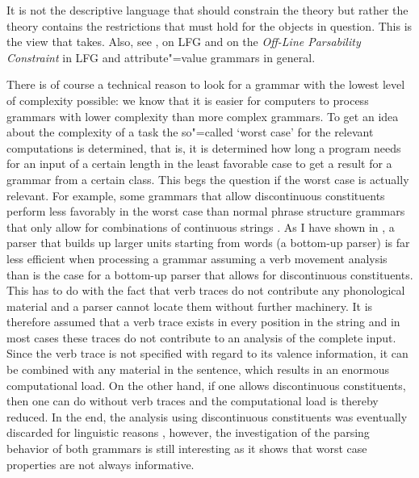 It is not the descriptive language that should constrain the theory but rather the theory contains the restrictions
that must hold for the objects in question. This is the view that \citet[, 280]{Chomsky81b} takes. Also, see 
,
 on LFG and  on the \emph{Off-Line Parsability Constraint}
in LFG and attribute"=value grammars in general.

There is of course a technical reason to look for a grammar with the lowest level of complexity possible:
we know that it is easier for computers to process grammars with lower complexity than more
complex grammars. To get an idea about the complexity of a task the so"=called `worst case' for the
relevant computations is determined, that is, it is determined how long a program needs for an input
of a certain length in the least favorable case to get a result for a grammar from a certain class. This begs the question if the worst case is actually relevant. 
For example, some grammars that allow discontinuous constituents perform less favorably in the worst case than normal phrase structure grammars 
that only allow for combinations of continuous strings \citep[Section~8]{Reape91}.
As I have shown in , a parser that builds up larger units starting from words (a bottom-up parser) is far less
efficient when processing a grammar assuming a verb movement analysis than is the case for a bottom-up parser that allows for discontinuous constituents.
This has to do with the fact that verb traces do not contribute any phonological material and a parser cannot locate them without further machinery.
It is therefore assumed that a verb trace exists in every position in the string and in most cases
these traces do not contribute to an analysis of the complete input.
Since the verb trace is not specified with regard to its valence information, it can be combined
with any material in the sentence, which results in an enormous computational load.
On the other hand, if one allows discontinuous constituents, then one can do without verb traces and the computational load is thereby reduced.
In the end, the analysis using discontinuous constituents was eventually discarded for linguistic reasons \citep{Mueller2005c,Mueller2005d,MuellerLehrbuch1,MuellerGS},
however, the investigation of the parsing behavior of both grammars is still interesting as it shows that worst case properties are not always
informative.


